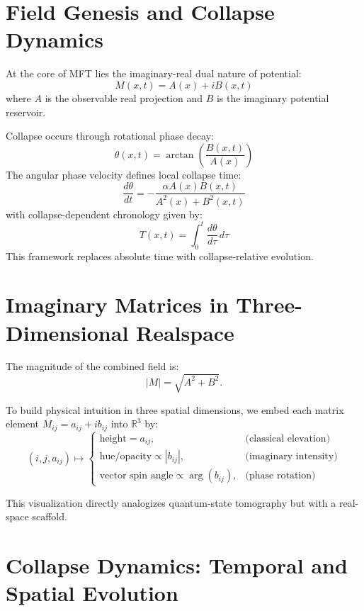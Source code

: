 \section{Field Genesis and Collapse Dynamics}

At the core of MFT lies the imaginary-real dual nature of potential:
\begin{equation}
M(x,t) = A(x) + i B(x,t)
\end{equation}
where $A$ is the observable real projection and $B$ is the imaginary potential reservoir.

Collapse occurs through rotational phase decay:
\begin{equation}
\theta(x,t) = \arctan\left( \frac{B(x,t)}{A(x)} \right)
\end{equation}
The angular phase velocity defines local collapse time:
\begin{equation}
\frac{d\theta}{dt} = -\frac{\alpha A(x) B(x,t)}{A^2(x) + B^2(x,t)}
\end{equation}
with collapse-dependent chronology given by:
\begin{equation}
T(x, t) = \int_0^t \frac{d\theta}{d\tau} \, d\tau
\end{equation}
This framework replaces absolute time with collapse-relative evolution.

\section{Imaginary Matrices in Three-Dimensional Realspace}

The magnitude of the combined field is:
\[
|M| = \sqrt{A^2 + B^2}.
\]

To build physical intuition in three spatial dimensions, we embed each matrix element $M_{ij} = a_{ij} + ib_{ij}$ into $\mathbb{R}^3$ by:
\[
(i,j,a_{ij}) \mapsto
\begin{cases}
  \text{height} = a_{ij}, & \text{(classical elevation)}\\
  \text{hue/opacity} \propto |b_{ij}|, & \text{(imaginary intensity)}\\
  \text{vector spin angle} \propto \arg(b_{ij}), & \text{(phase rotation)}
\end{cases}
\]

This visualization directly analogizes quantum-state tomography but with a real-space scaffold.

\section{Collapse Dynamics: Temporal and Spatial Evolution}

